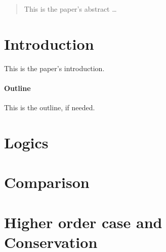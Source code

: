 \documentclass[12pt]{article}
\begin{document}
\maketitle

\begin{abstract}
This is the paper's abstract \ldots
\end{abstract}

\section{Introduction}
This is the paper's introduction.

\paragraph{Outline}
This is the outline, if needed.

\section{Logics}


\section{Comparison}


\section{Higher order case and Conservation}




\end{document}
